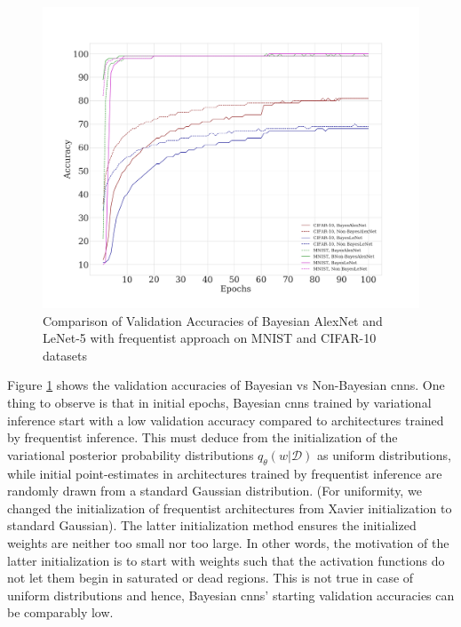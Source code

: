 \begin{figure}[t!] 
\begin{center}
\includegraphics[width=\linewidth]{Chapter5/Figs/results_mnist_CIFAR10.png}
\caption{Comparison of Validation Accuracies of Bayesian AlexNet and LeNet-5 with frequentist approach on MNIST and CIFAR-10 datasets}
\label{fig:MnistCIFAR10reesults}
\end{center}
\end{figure} 

\newline Figure \ref{fig:MnistCIFAR10reesults} shows the validation accuracies of Bayesian vs Non-Bayesian \acp{cnn}. One thing to observe is that in initial epochs, Bayesian \acp{cnn} trained by variational inference start with a low validation accuracy compared to architectures trained by frequentist inference. This must deduce from the initialization of the variational posterior probability distributions $q_{\theta}(w|\mathcal{D})$ as uniform distributions, while initial point-estimates in architectures trained by frequentist inference are randomly drawn from a standard Gaussian distribution. (For uniformity, we changed the initialization of frequentist architectures from Xavier initialization to standard Gaussian). The latter initialization method ensures the initialized weights are neither too small nor too large. In other words, the motivation of the latter initialization is to start with weights such that the activation functions do not let them begin in saturated or dead regions. This is not true in case of uniform distributions and hence, Bayesian \acp{cnn}' starting validation accuracies can be comparably low.

